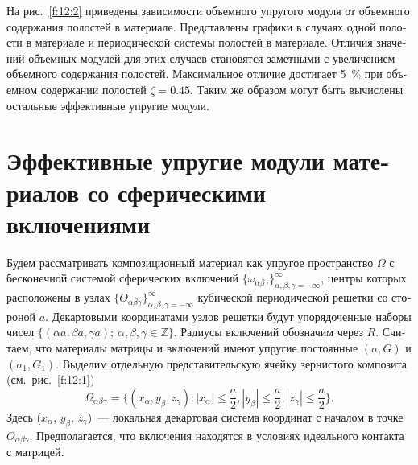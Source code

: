 \begin{russian}
На рис.~\ref{f:12:2} приведены зависимости объемного упругого модуля от объемного содержания полостей в материале. Представлены графики в случаях одной полости в материале и периодической системы полостей в материале. Отличия значений объемных модулей для этих случаев становятся заметными с увеличением объемного содержания полостей. Максимальное отличие достигает 5~\% при объемном содержании полостей $\zeta=0.45$. Таким же образом могут быть вычислены остальные эффективные упругие модули.


\section[Эффективные упругие модули материалов со сферическими включениями]{Эффективные упругие модули материалов со сферическими включениями}

Будем рассматривать композиционный материал как упругое пространство $\Omega$ с бесконечной системой сферических включений $\{\omega_{\alpha\beta\gamma}\}_{\alpha,\beta,\gamma=-\infty}^\infty$, центры которых расположены в узлах $\{O_{\alpha\beta\gamma}\}_{\alpha,\beta,\gamma=-\infty}^\infty$ кубической периодической решетки со стороной $a$. Декартовыми координатами узлов решетки будут упорядоченные наборы чисел $\{(\alpha a,\beta a,\gamma a);\,\alpha,\beta,\gamma\in\mathbb{Z}\}$. Радиусы включений обозначим через $R$. Считаем, что материалы матрицы и включений имеют упругие постоянные $(\sigma, G)$ и $(\sigma_1, G_1)$. Выделим отдельную представительскую ячейку зернистого композита (см.~рис.~\ref{f:12:1})
$$
\Omega_{\alpha\beta\gamma}=\bigg\{(x_\alpha,y_\beta,z_\gamma): |x_\alpha|\le\dfrac{a}{2},|y_\beta|\le\dfrac{a}{2},|z_\gamma|\le\dfrac{a}{2}\bigg\}.
$$
Здесь ($x_\alpha$, $y_\beta$, $z_\gamma$)~--- локальная декартовая система координат с началом в точке $O_{\alpha\beta\gamma}$. Предполагается, что включения находятся в условиях идеального контакта с матрицей.




\end{russian}

